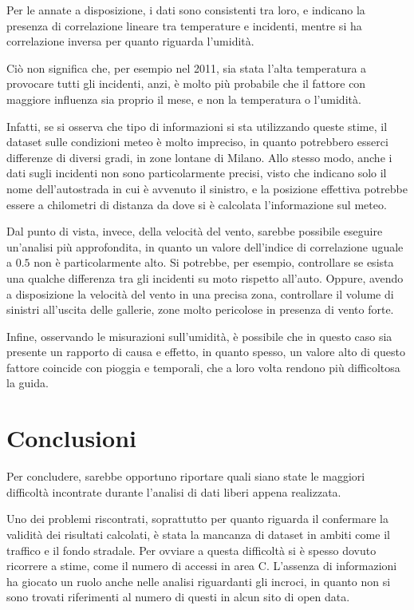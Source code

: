 \documentclass[a4paper,12pt]{report}
\begin{document}
Per le annate a disposizione, i dati sono consistenti tra loro, e indicano la presenza di 
correlazione lineare tra temperature e incidenti, mentre si ha correlazione inversa per quanto 
riguarda l'umidità.

Ciò non significa che, per esempio nel 2011, sia stata l'alta temperatura a provocare 
tutti gli incidenti, anzi, è molto più probabile che il fattore con maggiore 
influenza sia proprio il mese, e non la temperatura o l'umidità.

Infatti, se si osserva che tipo di informazioni si sta utilizzando 
queste stime, il dataset sulle condizioni meteo è molto impreciso, in quanto potrebbero 
esserci differenze di diversi gradi, in zone lontane di Milano.
Allo stesso modo, anche i dati sugli incidenti non sono particolarmente precisi, 
visto che indicano solo il nome dell'autostrada in cui è avvenuto 
il sinistro, e la posizione effettiva potrebbe essere a chilometri di distanza da dove 
si è calcolata l'informazione sul meteo.

Dal punto di vista, invece, della velocità del vento, sarebbe possibile eseguire 
un'analisi più approfondita, in quanto un valore dell'indice di correlazione uguale 
a $0.5$ non è particolarmente alto.
Si potrebbe, per esempio, controllare se esista una qualche differenza tra gli 
incidenti su moto rispetto all'auto. 
Oppure, avendo a disposizione la velocità del vento in una precisa zona, controllare 
il volume di sinistri all'uscita delle gallerie, zone molto pericolose 
in presenza di vento forte.

Infine, osservando le misurazioni sull'umidità, è possibile che in questo caso sia presente 
un rapporto di causa e effetto, in quanto spesso, un valore alto di questo fattore 
coincide con pioggia e temporali, che a loro volta rendono più difficoltosa la guida.


\chapter{Conclusioni}

Per concludere, sarebbe opportuno riportare quali siano state le maggiori difficoltà 
incontrate durante l'analisi di dati liberi appena realizzata.

Uno dei problemi riscontrati, soprattutto per quanto riguarda il confermare la 
validità dei risultati calcolati, è stata la mancanza di dataset in ambiti come 
il traffico e il fondo stradale. 
Per ovviare a questa difficoltà si è spesso dovuto ricorrere a stime, 
come il numero di accessi in area C. 
L'assenza di informazioni ha giocato un ruolo anche nelle analisi riguardanti gli incroci, 
in quanto non si sono trovati riferimenti al numero di questi in alcun sito di open data.
\end{document}
